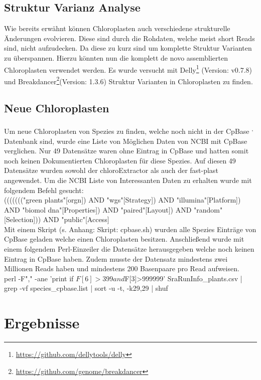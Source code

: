 \documentclass{scrartcl}
\begin{document}
\subsection{Struktur Varianz Analyse}
\label{sec-3-4}
Wie bereits erwähnt können Chloroplasten auch verschiedene strukturelle Änderungen evolvieren. Diese sind durch die Rohdaten, welche meist short Reads sind, nicht aufzudecken.
Da diese zu kurz sind um komplette Struktur Varianten zu überspannen.\footnotemark[7]{} Hierzu könnten nun die komplett de novo assemblierten Chloroplasten verwendet werden.
Es wurde versucht mit Delly\footnote{\url{https://github.com/dellytools/delly}} (Version: v0.7.8) und Breakdancer\footnote{\url{https://github.com/genome/breakdancer}}(Version: 1.3.6) Struktur Varianten in Chloroplasten zu finden.  

\subsection{Neue Chloroplasten}
\label{sec-3-5}
Um neue Chloroplasten von Spezies zu finden, welche noch nicht in der CpBase \footnotemark[37]{}\textsuperscript{,}\,\footnotemark[38]{} Datenbank sind, wurde eine Liste von Möglichen Daten von NCBI mit CpBase verglichen. Nur 49 Datensätze waren ohne 
Eintrag in CpBase und hatten somit noch keinen Dokumentierten Chloroplasten für diese Spezies. Auf diesen 49 Datensätze wurden sowohl der chloroExtractor als auch der fast-plast angewendet. 
Um die NCBI Liste von Interessanten Daten zu erhalten wurde mit folgendem Befehl gesucht:
\\
((((((("green plants"[orgn]) AND "wgs"[Strategy]) AND "illumina"[Platform]) AND "biomol dna"[Properties]) AND "paired"[Layout]) AND "random"[Selection])) AND "public"[Access]
\\
Mit einem Skript (s. Anhang: Skript: cpbase.sh) wurden alle Spezies Einträge von CpBase geladen welche einen Chloroplasten besitzen. Anschließend wurde mit einem folgendem Perl-Einzeiler
die Datensätze herausgegeben welche noch keinen Eintrag in CpBase haben. Zudem musste der Datensatz mindestens zwei Millionen Reads haben und mindestens 200 Basenpaare pro Read
aufweisen.
\\
perl -F"," -ane 'print if $F[6]>399 and $F[3]>999999' SraRunInfo\_plants.csv | grep -vf species\_cpbase.list | sort -u -t, -k29,29 | shuf



\section{Ergebnisse}
\label{sec-4}
\end{document}
